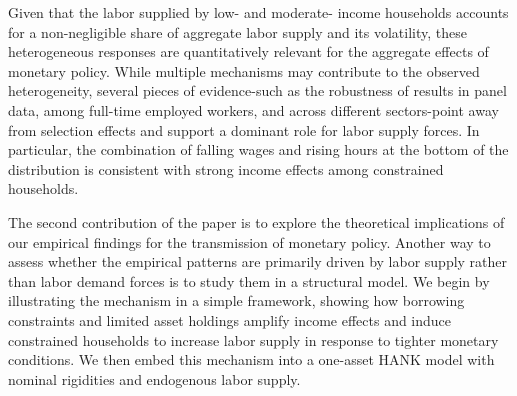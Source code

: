 \documentclass[a4paper,12pt]{article}%
\begin{document}

Given that the labor supplied by low- and moderate- income households accounts for a non-negligible share of aggregate labor supply and its volatility, these heterogeneous responses are quantitatively relevant for the aggregate effects of monetary policy. While multiple mechanisms may contribute to the observed heterogeneity, several pieces of evidence-such as the robustness of results in panel data, among full-time employed workers, and across different sectors-point away from selection effects and support a dominant role for labor supply forces. In particular, the combination of falling wages and rising hours at the bottom of the distribution is consistent with strong income effects among constrained households.

The second contribution of the paper is to explore the theoretical implications of our empirical findings for the transmission of monetary policy. Another way to assess whether the empirical patterns are primarily driven by labor supply rather than labor demand forces is to study them in a structural model. We begin by illustrating the mechanism in a simple framework, showing how borrowing constraints and limited asset holdings amplify income effects and induce constrained households to increase labor supply in response to tighter monetary conditions. We then embed this mechanism into a one-asset HANK model with nominal rigidities and endogenous labor supply.


\end{document}
